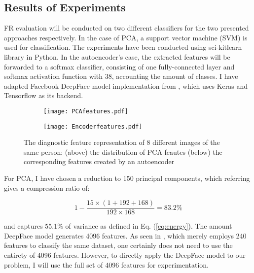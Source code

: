 \subsection{Results of Experiments}
FR evaluation will be conducted on two different classifiers for the two
presented approaches respectively. In the case of PCA, a support vector machine
(SVM) is used for classification. The experiments have been conducted using
sci-kitlearn \cite{sk} library in Python. In the autoencoder's case, the
extracted features will be forwarded to a softmax classifier, consisting of one
fully-connected layer and softmax activation function with 38, accounting the
amount of classes. I have adapted Facebook DeepFace model implementation from
\cite{serengil2017tensorflow101}, which uses Keras \cite{gulli2017deep} and
Tensorflow \cite{tensorflow} as its backend.

\begin{figure}[h]
  \begin{subfigure}{}
    \texttt{[image: PCAfeatures.pdf]}
  \end{subfigure}

  \begin{subfigure}{}
    \texttt{[image: Encoderfeatures.pdf]}
  \end{subfigure}

  \caption{The diagnostic feature representation of 8 different images of the same person: (above) the distribution of PCA feautes (below) the corresponding features created by an autoencoder}
  \label{features}
\end{figure}

For PCA, I have chosen a reduction to 150 principal components, which referring
\cite{abdi2007singular} gives a compression ratio of:

\begin{equation}
  1 - \frac{15 \times (1+192+168)}{192 \times 168} = 83.2\%
\end{equation}

and captures 55.1\% of variance as defined in Eq. (\ref{eq:energy}). The amount
DeepFace model generates 4096 features. As seen in
\cite{ramaiah2015illumination}, which merely employs 240 features to classify
the same dataset, one certainly does not need to use the entirety of 4096
features. However, to directly apply the DeepFace model to our problem, I will
use the full set of 4096 features for experimentation. 

